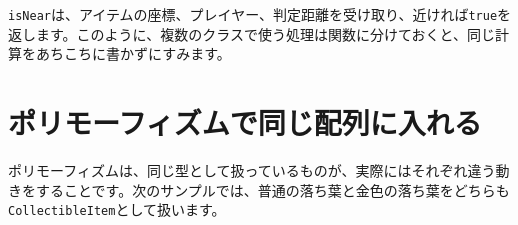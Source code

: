 \begin{listing}[htbp]
\inputminted[firstline=25,lastline=61]{ts}{typescript-p5/listings/chapter19/interface-without-vector.ts}
\caption{距離判定の関数を使う落ち葉（\texttt{chapter19/interface-without-vector.ts}）}
\label{lst:chapter19-interface-leaf-with-helper}
\end{listing}

\texttt{isNear}は、アイテムの座標、プレイヤー、判定距離を受け取り、近ければ\texttt{true}を返します。このように、複数のクラスで使う処理は関数に分けておくと、同じ計算をあちこちに書かずにすみます。

\section{ポリモーフィズムで同じ配列に入れる}

ポリモーフィズムは、同じ型として扱っているものが、実際にはそれぞれ違う動きをすることです。次のサンプルでは、普通の落ち葉と金色の落ち葉をどちらも\texttt{CollectibleItem}として扱います。

\begin{listing}[htbp]
\inputminted[firstline=1,lastline=49]{ts}{typescript-p5/listings/chapter19/polymorphism-items.ts}
\caption{ポリモーフィズムで使う共通部分（\texttt{chapter19/polymorphism-items.ts}）}
\label{lst:chapter19-polymorphism-base}
\end{listing}

\begin{listing}[htbp]
\inputminted[firstline=51,lastline=87]{ts}{typescript-p5/listings/chapter19/polymorphism-items.ts}
\caption{普通の落ち葉を表す\texttt{LeafItem}（\texttt{chapter19/polymorphism-items.ts}）}
\label{lst:chapter19-polymorphism-leaf}
\end{listing}

\begin{listing}[htbp]
\inputminted[firstline=89,lastline=127]{ts}{typescript-p5/listings/chapter19/polymorphism-items.ts}
\caption{得点の高い\texttt{GoldenLeafItem}（\texttt{chapter19/polymorphism-items.ts}）}
\label{lst:chapter19-polymorphism-golden-leaf}
\end{listing}

\begin{listing}[htbp]
\inputminted[firstline=4,lastline=49]{ts}{typescript-p5/listings/chapter19/polymorphism-sketch.ts}
\caption{\texttt{CollectibleItem[]}でまとめて動かす（\texttt{chapter19/polymorphism-sketch.ts}）}
\label{lst:chapter19-polymorphism-sketch}
\end{listing}

